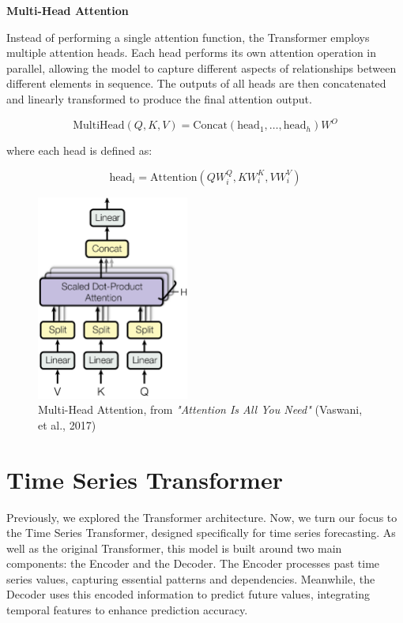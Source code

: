 \noindent\textbf{Multi-Head Attention}

\noindent Instead of performing a single attention function, the Transformer employs multiple attention heads. Each head performs its own attention operation in parallel, allowing the model to capture different aspects of relationships between different elements in sequence. The outputs of all heads are then concatenated and linearly transformed to produce the final attention output.

\[
\text{MultiHead}(Q,K,V) = \text{Concat}(\text{head}_1, \ldots, \text{head}_h) W^O
\]

\noindent where each head is defined as:

\[
\text{head}_i = \text{Attention}(QW_i^Q, KW_i^K, VW_i^V)
\]

\begin{figure}[htbp]
    \centering
    \includegraphics[width=5cm]{3_ChapterTranformerVariants/figuras/MultiHeadAttention.png}
    \caption{Multi-Head Attention, from \textit{"Attention Is All You Need"} (Vaswani, et al., 2017) \cite{vaswani2023attention}}
    \end{figure}

\section{Time Series Transformer}

Previously, we explored the Transformer architecture. Now, we turn our focus to the Time Series Transformer, designed specifically for time series forecasting. As well as the original Transformer, this model is built around two main components: the Encoder and the Decoder. The Encoder processes past time series values, capturing essential patterns and dependencies. Meanwhile, the Decoder uses this encoded information to predict future values, integrating temporal features to enhance prediction accuracy.

